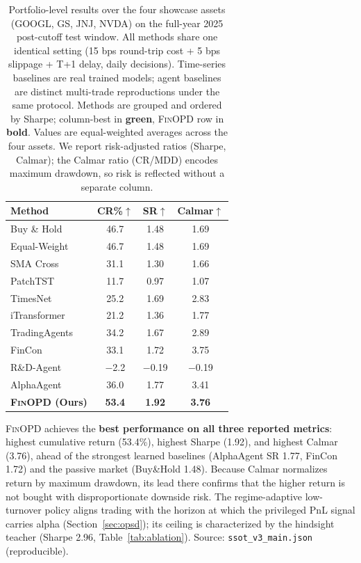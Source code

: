 \begin{table}[t]
\renewcommand{\arraystretch}{0.95}
\footnotesize
\caption{Portfolio-level results over the four showcase assets (GOOGL, GS, JNJ, NVDA) on the full-year 2025 post-cutoff test window. All methods share one identical setting (15 bps round-trip cost + 5 bps slippage + T+1 delay, daily decisions). Time-series baselines are real trained models; agent baselines are distinct multi-trade reproductions under the same protocol. Methods are grouped and ordered by Sharpe; column-best in \textbf{\textcolor{FBest}{green}}, \textsc{FinOPD} row in \textbf{bold}. Values are equal-weighted averages across the four assets. We report risk-adjusted ratios (Sharpe, Calmar); the Calmar ratio (CR/MDD) encodes maximum drawdown, so risk is reflected without a separate column.}
\setlength{\abovecaptionskip}{0.1cm}
\centering
\setlength{\tabcolsep}{8pt}
\begin{threeparttable}
\begin{tabular}{lccc}
\toprule
Method & CR\%$\uparrow$ & SR$\uparrow$ & Calmar$\uparrow$ \\
\midrule
Buy \& Hold & 46.7 & 1.48 & 1.69 \\
Equal-Weight & 46.7 & 1.48 & 1.69 \\
SMA Cross & 31.1 & 1.30 & 1.66 \\
\midrule
PatchTST & 11.7 & 0.97 & 1.07 \\
TimesNet & 25.2 & 1.69 & 2.83 \\
iTransformer & 21.2 & 1.36 & 1.77 \\
\midrule
TradingAgents & 34.2 & 1.67 & 2.89 \\
FinCon & 33.1 & 1.72 & 3.75 \\
R\&D-Agent & $-$2.2 & $-$0.19 & $-$0.19 \\
AlphaAgent & 36.0 & 1.77 & 3.41 \\
\midrule
\textbf{\textsc{FinOPD} (Ours)} & \textbf{\textcolor{FBest}{53.4}} & \textbf{\textcolor{FBest}{1.92}} & \textbf{\textcolor{FBest}{3.76}} \\
\bottomrule
\end{tabular}
\begin{tablenotes}
\footnotesize
\item \textsc{FinOPD} achieves the \textbf{best performance on all three reported metrics}: highest cumulative return (53.4\%), highest Sharpe (1.92), and highest Calmar (3.76), ahead of the strongest learned baselines (AlphaAgent SR 1.77, FinCon 1.72) and the passive market (Buy\&Hold 1.48). Because Calmar normalizes return by maximum drawdown, its lead there confirms that the higher return is not bought with disproportionate downside risk. The regime-adaptive low-turnover policy aligns trading with the horizon at which the privileged PnL signal carries alpha (Section~\ref{sec:opsd}); its ceiling is characterized by the hindsight teacher (Sharpe 2.96, Table~\ref{tab:ablation}). Source: \texttt{ssot\_v3\_main.json} (reproducible).
\end{tablenotes}
\end{threeparttable}
\label{tab:overall}
\end{table}
